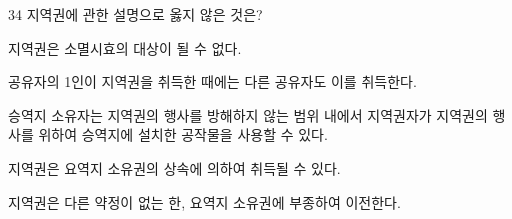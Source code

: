 \begin{question}{34}
지역권에 관한 설명으로 옳지 않은 것은?
\begin{choices}
  \item 지역권은 소멸시효의 대상이 될 수 없다.
  \item 공유자의 1인이 지역권을 취득한 때에는 다른 공유자도 이를 취득한다.
  \item 승역지 소유자는 지역권의 행사를 방해하지 않는 범위 내에서 지역권자가 지역권의 행사를 위하여 승역지에 설치한 공작물을 사용할 수 있다.
  \item 지역권은 요역지 소유권의 상속에 의하여 취득될 수 있다.
  \item 지역권은 다른 약정이 없는 한, 요역지 소유권에 부종하여 이전한다.
\end{choices}
\end{question}
